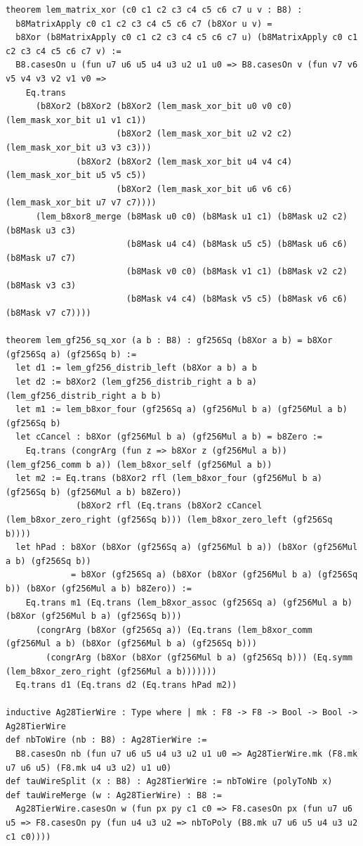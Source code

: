 \documentclass[11pt,letterpaper]{article}
\theoremstyle{spectralthm}
\begin{document}
\begin{lstlisting}[language=Lean4,caption={Standalone Pure Init.Prelude Term-Mode Lean 4 Kernel Suite (thm30--thm61, v0.0.0, 0 sorry, 0 axioms).},label={lst:lean_unified}]
theorem lem_matrix_xor (c0 c1 c2 c3 c4 c5 c6 c7 u v : B8) :
  b8MatrixApply c0 c1 c2 c3 c4 c5 c6 c7 (b8Xor u v) =
  b8Xor (b8MatrixApply c0 c1 c2 c3 c4 c5 c6 c7 u) (b8MatrixApply c0 c1 c2 c3 c4 c5 c6 c7 v) :=
  B8.casesOn u (fun u7 u6 u5 u4 u3 u2 u1 u0 => B8.casesOn v (fun v7 v6 v5 v4 v3 v2 v1 v0 =>
    Eq.trans
      (b8Xor2 (b8Xor2 (b8Xor2 (lem_mask_xor_bit u0 v0 c0) (lem_mask_xor_bit u1 v1 c1))
                      (b8Xor2 (lem_mask_xor_bit u2 v2 c2) (lem_mask_xor_bit u3 v3 c3)))
              (b8Xor2 (b8Xor2 (lem_mask_xor_bit u4 v4 c4) (lem_mask_xor_bit u5 v5 c5))
                      (b8Xor2 (lem_mask_xor_bit u6 v6 c6) (lem_mask_xor_bit u7 v7 c7))))
      (lem_b8xor8_merge (b8Mask u0 c0) (b8Mask u1 c1) (b8Mask u2 c2) (b8Mask u3 c3)
                        (b8Mask u4 c4) (b8Mask u5 c5) (b8Mask u6 c6) (b8Mask u7 c7)
                        (b8Mask v0 c0) (b8Mask v1 c1) (b8Mask v2 c2) (b8Mask v3 c3)
                        (b8Mask v4 c4) (b8Mask v5 c5) (b8Mask v6 c6) (b8Mask v7 c7))))

theorem lem_gf256_sq_xor (a b : B8) : gf256Sq (b8Xor a b) = b8Xor (gf256Sq a) (gf256Sq b) :=
  let d1 := lem_gf256_distrib_left (b8Xor a b) a b
  let d2 := b8Xor2 (lem_gf256_distrib_right a b a) (lem_gf256_distrib_right a b b)
  let m1 := lem_b8xor_four (gf256Sq a) (gf256Mul b a) (gf256Mul a b) (gf256Sq b)
  let cCancel : b8Xor (gf256Mul b a) (gf256Mul a b) = b8Zero :=
    Eq.trans (congrArg (fun z => b8Xor z (gf256Mul a b)) (lem_gf256_comm b a)) (lem_b8xor_self (gf256Mul a b))
  let m2 := Eq.trans (b8Xor2 rfl (lem_b8xor_four (gf256Mul b a) (gf256Sq b) (gf256Mul a b) b8Zero))
              (b8Xor2 rfl (Eq.trans (b8Xor2 cCancel (lem_b8xor_zero_right (gf256Sq b))) (lem_b8xor_zero_left (gf256Sq b))))
  let hPad : b8Xor (b8Xor (gf256Sq a) (gf256Mul b a)) (b8Xor (gf256Mul a b) (gf256Sq b))
             = b8Xor (gf256Sq a) (b8Xor (b8Xor (gf256Mul b a) (gf256Sq b)) (b8Xor (gf256Mul a b) b8Zero)) :=
    Eq.trans m1 (Eq.trans (lem_b8xor_assoc (gf256Sq a) (gf256Mul a b) (b8Xor (gf256Mul b a) (gf256Sq b)))
      (congrArg (b8Xor (gf256Sq a)) (Eq.trans (lem_b8xor_comm (gf256Mul a b) (b8Xor (gf256Mul b a) (gf256Sq b)))
        (congrArg (b8Xor (b8Xor (gf256Mul b a) (gf256Sq b))) (Eq.symm (lem_b8xor_zero_right (gf256Mul a b)))))))
  Eq.trans d1 (Eq.trans d2 (Eq.trans hPad m2))

inductive Ag28TierWire : Type where | mk : F8 -> F8 -> Bool -> Bool -> Ag28TierWire
def nbToWire (nb : B8) : Ag28TierWire :=
  B8.casesOn nb (fun u7 u6 u5 u4 u3 u2 u1 u0 => Ag28TierWire.mk (F8.mk u7 u6 u5) (F8.mk u4 u3 u2) u1 u0)
def tauWireSplit (x : B8) : Ag28TierWire := nbToWire (polyToNb x)
def tauWireMerge (w : Ag28TierWire) : B8 :=
  Ag28TierWire.casesOn w (fun px py c1 c0 => F8.casesOn px (fun u7 u6 u5 => F8.casesOn py (fun u4 u3 u2 => nbToPoly (B8.mk u7 u6 u5 u4 u3 u2 c1 c0))))


\end{lstlisting}
\end{document}
